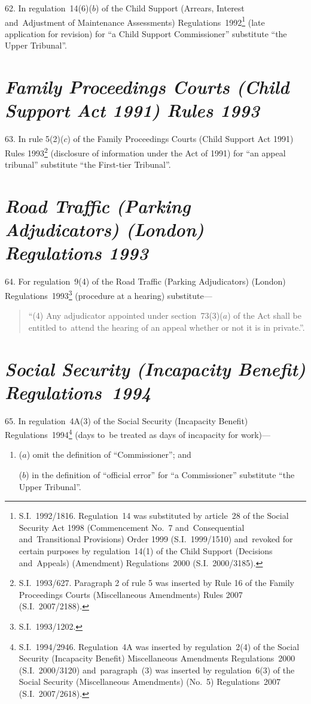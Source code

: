 \documentclass[12pt,a4paper]{article}
\begin{document}
62.  In regulation~14(6)($b$)  of the Child Support (Arrears, Interest and~Adjustment of Maintenance Assessments) Regulations~1992\footnote{S.I.~1992/1816. Regulation~14 was substituted by article~28 of the Social Security Act 1998 (Commencement No.~7 and~Consequential and~Transitional Provisions) Order 1999 (S.I.~1999/1510) and~revoked for certain purposes by regulation~14(1) of the Child Support (Decisions and~Appeals) (Amendment) Regulations~2000 (S.I.~2000/3185).} (late application for revision) for “a Child Support Commissioner” substitute “the Upper Tribunal”.

\section*{\itshape\sloppy Family Proceedings Courts (Child Support Act 1991) Rules 1993}

63.  In rule 5(2)($c$)  of the Family Proceedings Courts (Child Support Act 1991) Rules 1993\footnote{S.I.~1993/627. Paragraph 2 of rule 5 was inserted by Rule 16 of the Family Proceedings Courts (Miscellaneous Amendments) Rules 2007 (S.I.~2007/2188).} (disclosure of information under the Act of 1991) for “an appeal tribunal” substitute “the First-tier Tribunal”.

\section*{\itshape\sloppy Road Traffic (Parking Adjudicators) (London) Regulations 1993}

64.  For regulation~9(4) of the Road Traffic (Parking Adjudicators) (London) Regulations~1993\footnote{S.I.~1993/1202.} (procedure at a hearing) substitute—
\begin{quotation}
“(4) Any adjudicator appointed under section~73(3)($a$)  of the Act shall be entitled to~attend the hearing of an appeal whether or not it is in private.”.
\end{quotation}

\section*{\itshape Social Security (Incapacity Benefit) Regulations~1994}

65.  In regulation~4A(3) of the Social Security (Incapacity Benefit) Regulations~1994\footnote{S.I.~1994/2946. Regulation~4A was inserted by regulation~2(4) of the Social Security (Incapacity Benefit) Miscellaneous Amendments Regulations~2000 (S.I.~2000/3120) and~paragraph~(3) was inserted by regulation~6(3) of the Social Security (Miscellaneous Amendments) (No.~5) Regulations~2007 (S.I.~2007/2618).} (days to~be treated as days of incapacity for work)—
\begin{enumerate}\item[]
($a$) omit the definition of “Commissioner”; and

($b$) in the definition of “official error” for “a Commissioner” substitute “the Upper Tribunal”.
\end{enumerate}
\end{document}
